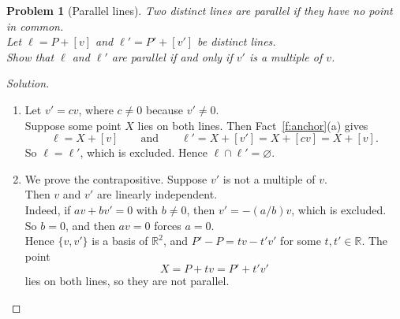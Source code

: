 \documentclass[11pt,a4paper]{article}
\theoremstyle{boxed}
\newtheorem{problem}{Problem}
\theoremstyle{definition}
\newenvironment{solution}{\begin{proof}[Solution]}{\end{proof}}
\newenvironment{plate}{\par\medskip\noindent\begin{minipage}{\linewidth}\centering}{\end{minipage}\par\medskip}
\newcommand{\R}{\mathbb{R}}
\newcommand{\ip}[2]{\langle #1, #2 \rangle}
\begin{document}
\begin{plate}
\label{fig:normal}
\end{plate}

\begin{problem}[Parallel lines]\label{p:parallel}
Two distinct lines are \emph{parallel} if they have no point in common.\\
Let $\ell=P+[v]$ and $\ell'=P'+[v']$ be distinct lines.\\
Show that $\ell$ and $\ell'$ are parallel if and only if $v'$ is a multiple of $v$.
\end{problem}

\begin{solution}
\leavevmode
\begin{enumerate}[leftmargin=2.5em]
    \item[($\Leftarrow$)] Let $v'=cv$, where $c\neq0$ because $v'\neq0$.\\
    Suppose some point $X$ lies on both lines. Then Fact~\ref{f:anchor}(a) gives
    \[
    \ell=X+[v] \qquad\text{and}\qquad \ell'=X+[v']=X+[cv]=X+[v].
    \]
    So $\ell=\ell'$, which is excluded. Hence $\ell\cap\ell'=\varnothing$.
    \item[($\Rightarrow$)] We prove the contrapositive. Suppose $v'$ is not a multiple of $v$.\\
    Then $v$ and $v'$ are linearly independent.\\
    Indeed, if $av+bv'=0$ with $b\neq0$, then $v'=-(a/b)v$, which is excluded.\\
    So $b=0$, and then $av=0$ forces $a=0$.\\
    Hence $\{v,v'\}$ is a basis of $\R^2$, and $P'-P=tv-t'v'$ for some $t,t'\in\R$. The point
    \[
    X=P+tv=P'+t'v'
    \]
    lies on both lines, so they are not parallel. \qedhere
\end{enumerate}
\end{solution}
\end{document}
